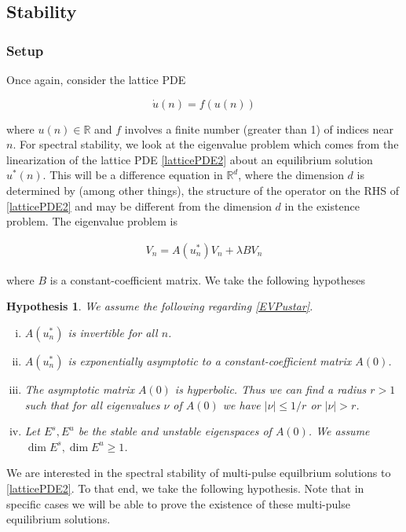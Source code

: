 \documentclass[12pt]{article}
\def\R{{\mathbb R}}
\newtheorem{hypothesis}{Hypothesis}
\begin{document}
\subsection{Stability}

\subsubsection{Setup}

Once again, consider the lattice PDE

\begin{equation}\label{latticePDE2}
\dot{u}(n) = f(u(n))
\end{equation}

where $u(n) \in \R$ and $f$ involves a finite number (greater than 1) of indices near $n$. For spectral stability, we look at the eigenvalue problem which comes from the linearization of the lattice PDE \eqref{latticePDE2} about an equilibrium solution $u^*(n)$. This will be a difference equation in $\R^d$, where the dimension $d$ is determined by (among other things), the structure of the operator on the RHS of \eqref{latticePDE2} and may be different from the dimension $d$ in the existence problem. The eigenvalue problem is

\begin{align}\label{EVPustar}
V_n = A(u^*_n) V_n + \lambda B V_n
\end{align}

where $B$ is a constant-coefficient matrix. We take the following hypotheses

\begin{hypothesis}\label{EVPhyp}
We assume the following regarding \eqref{EVPustar}.
\begin{enumerate}[(i)]
\item $A(u^*_n)$ is invertible for all $n$.
\item $A(u^*_n)$ is exponentially asymptotic to a constant-coefficient matrix $A(0)$.
\item The asymptotic matrix $A(0)$ is hyperbolic. Thus we can find a radius $r > 1$ such that for all eigenvalues $\nu$ of $A(0)$ we have $|\nu| \leq 1/r$ or $|\nu| > r$. 
\item Let $E^s, E^u$ be the stable and unstable eigenspaces of $A(0)$. We assume $\dim E^s, \dim E^u \geq 1$.
\end{enumerate}
\end{hypothesis}

We are interested in the spectral stability of multi-pulse equilbrium solutions to \eqref{latticePDE2}. To that end, we take the following hypothesis. Note that in specific cases we will be able to prove the existence of these multi-pulse equilibrium solutions.
\end{document}
